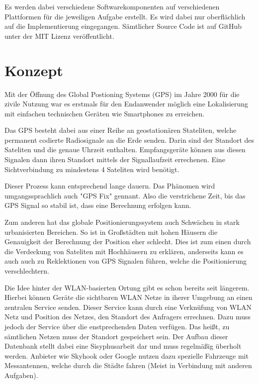 \documentclass[11pt,a4paper]{article}
\begin{document}
Es werden dabei verschiedene Softwarekomponenten auf verschiedenen Plattformen für die jeweiligen Aufgabe erstellt. Es wird dabei nur oberflächlich auf die Implementierung eingegangen. Sämtlicher Source Code ist auf GitHub unter der MIT Lizenz veröffentlicht. 



\section{Konzept}

Mit der Öffnung des Global Postioning Systems (GPS) im Jahre 2000 für die zivile Nutzung war es erstmals für den Endanwender möglich eine Lokalisierung mit einfachen technischen Geräten wie Smartphones zu erreichen.

Das GPS besteht dabei aus einer Reihe an geostationären  Stateliten, welche permanent codierte Radiosignale an die Erde senden. Darin sind der Standort des Sateliten und die genaue Uhrzeit enthalten. Empfangsgeräte können aus diesen Signalen dann ihren Standort mittels der Signallaufzeit errechenen. Eine Sichtverbindung zu mindestens 4 Sateliten wird benötigt.

Dieser Prozess kann entsprechend lange dauern. Das Phänomen wird umgangssprachlich auch "GPS Fix" gennant. Also die verstrichene Zeit, bis das GPS Signal so stabil ist, dass eine Berechnung erfolgen kann. 

Zum anderen hat das globale Positionierungssystem auch Schwächen in stark urbanisierten Bereichen. So ist in Großstädten mit hohen Häusern die Genauigkeit der Berechnung der Position eher schlecht. Dies ist zum einen durch die Verdeckung von Sateliten mit Hochhäusern zu erklären, anderseits kann es auch auch zu Reklektionen von GPS Signalen führen, welche die Positionierung verschlechtern.

Die Idee hinter der WLAN-basierten Ortung gibt es schon bereits seit längerem. Hierbei können Geräte die sichtbaren WLAN Netze in iherer Umgebung an einen zentralen Service senden. Dieser Service kann durch eine Verknüfung von WLAN Netz und Position des Netzes, den Standort des Anfragers errechnen. Dazu muss jedoch der Service über die enstprechenden Daten verfügen. Das heißt, zu sämtlichen Netzen muss der Standort gespeichert sein. Der Aufbau dieser Datenbank stellt dabei eine Sisyphusarbeit dar und muss regelmäßig überholt werden. Anbieter wie Skyhook oder Google 
nutzen dazu spezielle Fahrzeuge mit Messantennen, welche durch die Städte fahren (Meist in Verbindung mit anderen Aufgaben). 
\end{document}
